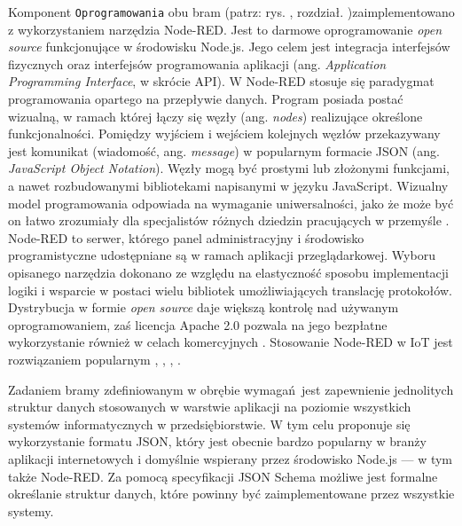 \documentclass[a4paper, 12pt, twoside]{article}
\begin{document}
Komponent \texttt{Oprogramowania} obu bram (patrz: rys. , rozdział. )zaimplementowano z wykorzystaniem
narzędzia Node-RED. Jest to darmowe oprogramowanie \emph{open source} funkcjonujące
w środowisku Node.js. Jego celem jest integracja interfejsów
fizycznych oraz interfejsów programowania aplikacji
(ang. \emph{Application Programming Interface}, w skrócie API).
W Node-RED stosuje się paradygmat programowania opartego na przepływie danych.
Program posiada postać wizualną, w ramach której łączy się węzły (ang. \emph{nodes})
realizujące określone funkcjonalności. Pomiędzy wyjściem i wejściem kolejnych
węzłów przekazywany jest komunikat (wiadomość, ang. \emph{message}) w popularnym formacie
JSON (ang. \emph{JavaScript Object Notation}). Węzły mogą być prostymi lub złożonymi
funkcjami, a nawet rozbudowanymi bibliotekami napisanymi w języku JavaScript.
Wizualny model programowania odpowiada na wymaganie uniwersalności,
jako że może być on łatwo zrozumiały dla specjalistów różnych dziedzin pracujących w przemyśle
\cite{flow-programming}.
Node-RED to serwer, którego panel administracyjny i środowisko programistyczne
udostępniane są w ramach aplikacji przeglądarkowej. Wyboru opisanego
narzędzia dokonano ze względu na elastyczność sposobu implementacji logiki i
wsparcie w postaci wielu bibliotek umożliwiających translację protokołów.
Dystrybucja w formie \emph{open source} daje większą kontrolę nad używanym oprogramowaniem,
zaś licencja Apache 2.0 pozwala na jego bezpłatne wykorzystanie również
w celach komercyjnych \cite{node-red}. Stosowanie Node-RED w IoT jest rozwiązaniem popularnym \cite{iot-gateway-medical-and-industrial},
\cite{design-impl-node-gateway}, \cite{iiot-opensource-gateway}, \cite{low-cost-esp32-pi-node-red-scada}.

Zadaniem bramy zdefiniowanym w obrębie wymagań jest zapewnienie jednolitych
struktur danych stosowanych w warstwie aplikacji na poziomie wszystkich
systemów informatycznych w przedsiębiorstwie. W tym celu proponuje się
wykorzystanie formatu JSON, który jest obecnie bardzo popularny w branży
aplikacji internetowych i domyślnie wspierany przez środowisko Node.js --- w tym
także Node-RED. Za pomocą specyfikacji JSON Schema możliwe jest
formalne określanie struktur danych, które powinny być zaimplementowane przez
wszystkie systemy.
\end{document}
